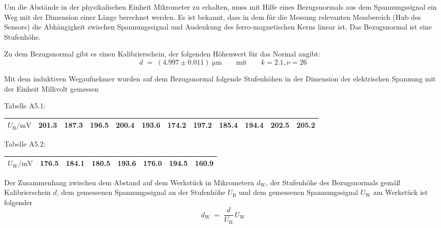 Um die Abstände in der physikalischen Einheit Mikrometer zu erhalten, muss mit Hilfe
eines Bezugsnormals aus dem Spannungssignal ein Weg mit der Dimension einer Länge
berechnet werden.
Es ist bekannt, dass in dem für die Messung relevanten Messbereich (Hub des Sensors)
die Abhängigkeit zwischen Spannungssignal und Auslenkung des ferro-magnetischen Kerns
linear ist.
Das Bezugsnormal ist eine Stufenhöhe.

Zu dem Bezugsnormal gibt es einen Kalibrierschein, der folgenden Höhenwert für das
Normal angibt:
\begin{equation}
d \; = \; (4.997 \pm 0.011) \; \mathrm{\mu m} \qquad \mathrm{mit} \qquad k = 2.1, \nu = 26
\label{kalBezug}
\end{equation}

Mit dem induktiven Wegaufnehmer wurden auf dem Bezugsnormal folgende Stufenhöhen in
der Dimension der elektrischen Spannung mit der Einheit Millivolt gemessen

Tabelle A5.1:\\
\begin{tabular}{c||c|c|c|c|c|c|c|c|c|c|c}
\hline
$U_\mathrm{B} / \mathrm{mV}$ & 201.3 & 187.3 & 196.5 & 200.4 & 193.6 & 174.2 & 197.2 & 185.4 & 194.4 & 202.5 & 205.2\\
\hline
\end{tabular}

Tabelle A5.2:\\
\begin{tabular}{c||c|c|c|c|c|c|c}
\hline
$U_\mathrm{W} / \mathrm{mV}$ & 176.5 & 184.1 & 180.5 & 193.6 & 176.0 & 194.5 & 160.9 \\
\hline
\end{tabular}

Der Zusammenhang zwischen dem Abstand auf dem Werkstück in Mikrometern $d_\mathrm{W}$,
der Stufenhöhe des Bezugsnormals gemäß Kalibrierschein $d$, dem gemessenen Spannungssignal
an der Stufenhöhe $U_\mathrm{B}$ und dem gemessenen Spannungssignal $U_\mathrm{W}$ am Werkstück
ist folgender
\begin{equation}
d_\mathrm{W} \; = \; \frac{d}{U_\mathrm{B}} \, U_\mathrm{W}
\end{equation}

